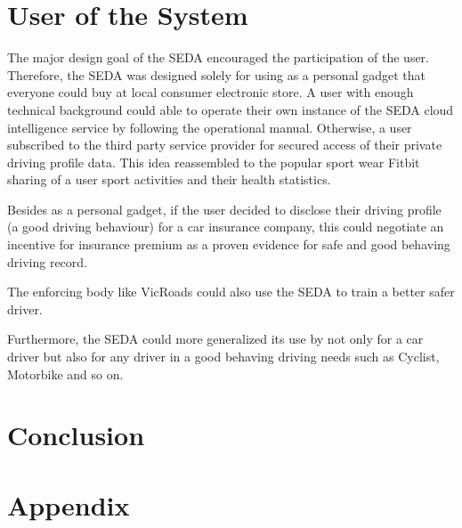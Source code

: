 \documentclass{chi-ext}
\begin{document}
\begin{multicols}{2}
\section{User of the System}
The major design goal of the SEDA encouraged the participation of the user. Therefore, the SEDA was designed solely for using as a personal gadget that everyone could buy at local consumer electronic store. A user with enough technical background could able to operate their own instance of the SEDA cloud intelligence service by following the operational manual. Otherwise, a user subscribed to the third party service provider for secured access of their private driving profile data. This idea reassembled to the popular sport wear Fitbit sharing of a user sport activities and their health statistics.

Besides as a personal gadget, if the user decided to disclose their driving profile (a good driving behaviour) for a car insurance company, this could negotiate an incentive for insurance premium as a proven evidence for safe and good behaving driving record.

The enforcing body like VicRoads could also use the SEDA to train a better safer driver.

Furthermore, the SEDA could more generalized its use by not only for a car driver but also for any driver in a good behaving driving needs such as Cyclist, Motorbike and so on.

\section{Conclusion}





\end{multicols}

\newpage
\section{Appendix}

\end{document}
